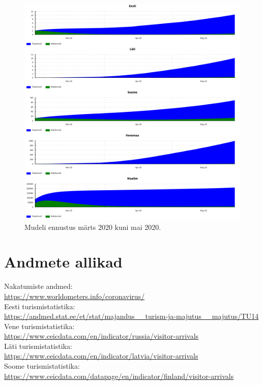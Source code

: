 \documentclass[a4paper]{article}
\begin{document}
  \begin{figure}
    \centering
    \includegraphics[width=\textwidth]{graphics/twomonths.png}
    \caption{Mudeli ennustus märts 2020 kuni mai 2020.}
  \end{figure}

  \section{Andmete allikad}
  Nakatumiste andmed: \\
  \url{https://www.worldometers.info/coronavirus/} \\
  Eesti turismistatistika: \\
  \url{https://andmed.stat.ee/et/stat/majandus__turism-ja-majutus__majutus/TU14} \\
  Vene turismistatistika: \\
  \url{https://www.ceicdata.com/en/indicator/russia/visitor-arrivals} \\
  Läti turismistatistika: \\
  \url{https://www.ceicdata.com/en/indicator/latvia/visitor-arrivals} \\
  Soome turismistatistika: \\
  \url{https://www.ceicdata.com/datapage/en/indicator/finland/visitor-arrivals} \\
  
\end{document}
